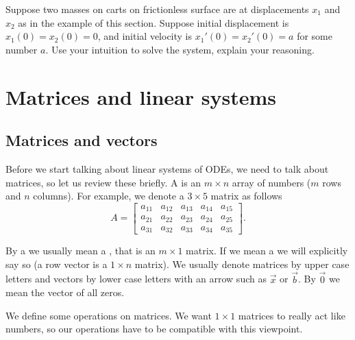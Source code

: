 \documentclass[12pt]{book}
\begin{document}
\begin{exercise}
Suppose two masses on carts on frictionless surface are at 
displacements $x_1$ and $x_2$ as in the example of this section.
Suppose initial displacement is $x_1(0)=x_2(0)=0$, and initial velocity is $x_1'(0) = x_2'(0) = a$ for some number $a$.
Use your intuition
to solve the system, explain your reasoning.
\end{exercise}


\sectionnewpage
\section{Matrices and linear systems} \label{sec:matrix}


\subsection{Matrices and vectors}

Before we start talking about linear systems of ODEs, we need to
talk about matrices, so let us review these briefly.  A \emph{}
is an $m
\times n$ array of numbers ($m$ rows and $n$ columns).  For example, we denote
a $3 \times 5$ matrix as follows
\begin{equation*}
A = 
\begin{bmatrix}
a_{11} & a_{12} & a_{13} & a_{14} & a_{15} \\
a_{21} & a_{22} & a_{23} & a_{24} & a_{25} \\
a_{31} & a_{32} & a_{33} & a_{34} & a_{35}
\end{bmatrix} .
\end{equation*}

By a \emph{} we usually mean a \emph{}, that is an $m \times 1$ matrix.  If we mean a \emph{} we will explicitly say so (a row vector is a $1 \times n$ matrix).
We usually denote
matrices by upper case letters and vectors by lower case letters with an
arrow such as $\vec{x}$ or $\vec{b}$.  By $\vec{0}$ we mean the vector
of all zeros.

We define some operations on matrices.  We 
want $1 \times 1$ matrices to really act like numbers, so our operations
have to be compatible with this viewpoint.
\end{document}
